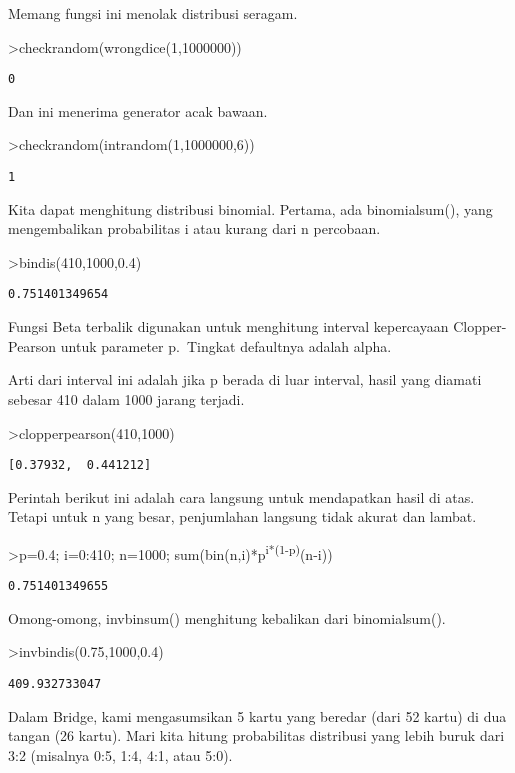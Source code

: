\documentclass[
]{book}
\begin{document}
Memang fungsi ini menolak distribusi seragam.

\textgreater checkrandom(wrongdice(1,1000000))

\begin{verbatim}
0
\end{verbatim}

Dan ini menerima generator acak bawaan.

\textgreater checkrandom(intrandom(1,1000000,6))

\begin{verbatim}
1
\end{verbatim}

Kita dapat menghitung distribusi binomial. Pertama, ada binomialsum(), yang mengembalikan probabilitas i atau kurang dari n percobaan.

\textgreater bindis(410,1000,0.4)

\begin{verbatim}
0.751401349654
\end{verbatim}

Fungsi Beta terbalik digunakan untuk menghitung interval kepercayaan Clopper-Pearson untuk parameter p.~Tingkat defaultnya adalah alpha.

Arti dari interval ini adalah jika p berada di luar interval, hasil yang diamati sebesar 410 dalam 1000 jarang terjadi.

\textgreater clopperpearson(410,1000)

\begin{verbatim}
[0.37932,  0.441212]
\end{verbatim}

Perintah berikut ini adalah cara langsung untuk mendapatkan hasil di atas. Tetapi untuk n yang besar, penjumlahan langsung tidak akurat dan lambat.

\textgreater p=0.4; i=0:410; n=1000; sum(bin(n,i)*p\textsuperscript{i*(1-p)}(n-i))

\begin{verbatim}
0.751401349655
\end{verbatim}

Omong-omong, invbinsum() menghitung kebalikan dari binomialsum().

\textgreater invbindis(0.75,1000,0.4)

\begin{verbatim}
409.932733047
\end{verbatim}

Dalam Bridge, kami mengasumsikan 5 kartu yang beredar (dari 52 kartu) di dua tangan (26 kartu). Mari kita hitung probabilitas distribusi yang lebih buruk dari 3:2 (misalnya 0:5, 1:4, 4:1, atau 5:0).
\end{document}
